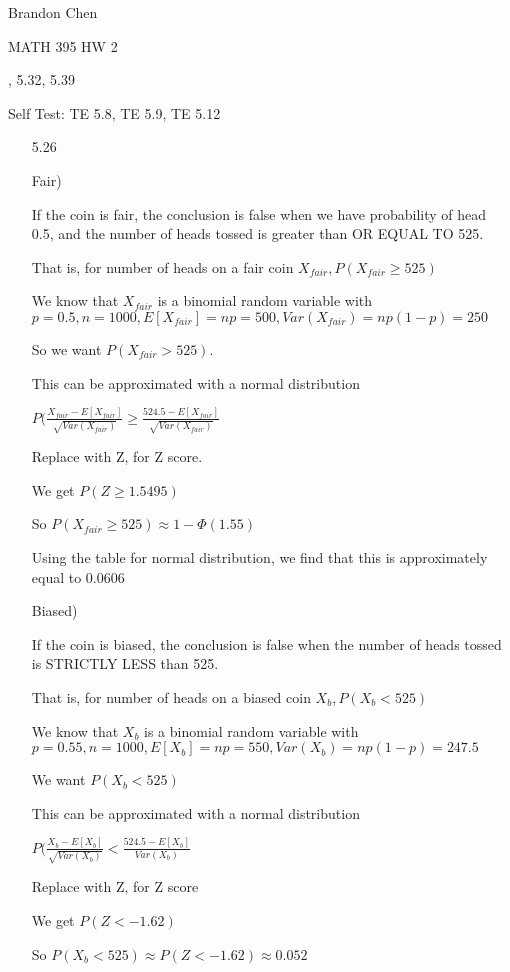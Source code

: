 \documentclass[11pt]{article}
\begin{document}
\noindent Brandon Chen

\noindent MATH 395 HW 2

, 5.32, 5.39

\noindent Self Test: TE 5.8, TE 5.9, TE 5.12

\begin{itemize}

\item[5.26]

Fair)

If the coin is fair, the conclusion is false when we have probability of head 0.5, and the number of heads tossed is greater than OR EQUAL TO 525.

That is, for number of heads on a fair coin $X_{fair}, P(X_{fair} \geq 525)$

We know that $X_{fair}$ is a binomial random variable with $p = 0.5, n = 1000, E[X_{fair}] = np = 500, Var(X_{fair}) = np(1-p) = 250$

So we want $P(X_{fair} > 525)$.

This can be approximated with a normal distribution

$P(\frac{X_{fair} - E[X_{fair}]}{\sqrt{Var(X_{fair})}} \geq \frac{524.5 - E[X_{fair}]}{\sqrt{Var(X_{fair})}}$ 

Replace with Z, for Z score.

We get $P(Z \geq 1.5495)$

So $P(X_{fair} \geq 525) \approx 1 - \Phi(1.55)$

Using the table for normal distribution, we find that this is approximately equal to 0.0606

Biased) 

If the coin is biased, the conclusion is false when the number of heads tossed is STRICTLY LESS than 525.

That is, for number of heads on a biased coin $X_b, P(X_b < 525)$

We know that $X_b$ is a binomial random variable with $p = 0.55, n = 1000, E[X_b] = np = 550, Var(X_b) = np(1-p) = 247.5$

We want $P(X_b < 525)$

This can be approximated with a normal distribution

$P(\frac{X_b - E[X_b]}{\sqrt{Var(X_b)}} < \frac{524.5 - E[X_b]}{Var(X_b)}$

Replace with Z, for Z score

We get $P(Z < -1.62)$

So $P(X_b < 525) \approx P(Z < -1.62) \approx 0.052$


\end{itemize}
\end{document}
